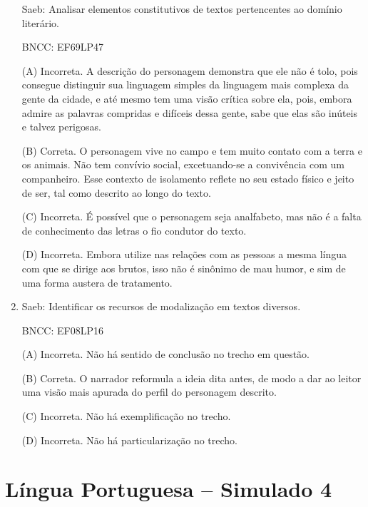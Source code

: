 \begin{enumerate}
Saeb: Analisar elementos constitutivos de textos pertencentes ao domínio
literário.

BNCC: EF69LP47

(A) Incorreta. A descrição do personagem demonstra que ele não é tolo,
pois consegue distinguir sua linguagem simples da linguagem mais
complexa da gente da cidade, e até mesmo tem uma visão crítica sobre
ela, pois, embora admire as palavras compridas e difíceis dessa gente,
sabe que elas são inúteis e talvez perigosas.

(B) Correta. O personagem vive no campo e tem muito contato com a terra
e os animais. Não tem convívio social, excetuando-se a convivência com
um companheiro. Esse contexto de isolamento reflete no seu estado físico
e jeito de ser, tal como descrito ao longo do texto.

(C) Incorreta. É possível que o personagem seja analfabeto, mas não é a
falta de conhecimento das letras o fio condutor do texto.

(D) Incorreta. Embora utilize nas relações com as pessoas a mesma língua
com que se dirige aos brutos, isso não é sinônimo de mau humor, e sim de
uma forma austera de tratamento.

\item

Saeb: Identificar os recursos de modalização em textos diversos.

BNCC: EF08LP16

(A) Incorreta. Não há sentido de conclusão no trecho em questão.

(B) Correta. O narrador reformula a ideia dita antes, de modo a dar ao
leitor uma visão mais apurada do perfil do personagem descrito.

(C) Incorreta. Não há exemplificação no trecho.

(D) Incorreta. Não há particularização no trecho.

\end{enumerate}

\section*{Língua Portuguesa – Simulado 4}

